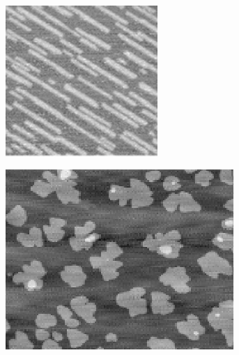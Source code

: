 \begin{figure}[H]
	\centering	
	\captionsetup{justification=centering}	
	\begin{center}
		\begin{subfigure}[t]{2.5in}
			\centering
			\includegraphics[width=.7\textwidth]{./imagenes/buena1}
			\subcaption{}\label{buena1}
		\end{subfigure}
		\begin{subfigure}[t]{2.5in}
			\centering
			\includegraphics[width=.8\textwidth]{./imagenes/ejemplo2}	
			\subcaption{}\label{buena2}
		\end{subfigure}
		\begin{subfigure}[t]{2.5in}
			\centering

\end{subfigure}
\end{center}
\end{figure}
